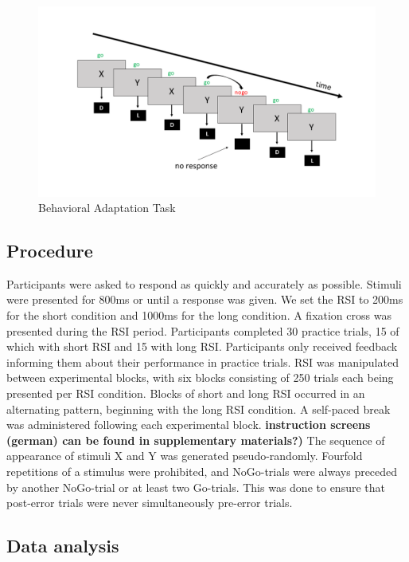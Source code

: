 \documentclass[
  man,floatsintext]{apa7}
\begin{document}
\begin{figure}
\centering
\includegraphics{images/bat_slide_pp/Slide1.png}
\caption{\label{fig:bat-example}Behavioral Adaptation Task}
\end{figure}

\hypertarget{procedure}{%
\subsection{Procedure}\label{procedure}}

Participants were asked to respond as quickly and accurately as possible. Stimuli were presented for 800ms or until a response was given. We set the RSI to 200ms for the short condition and 1000ms for the long condition. A fixation cross was presented during the RSI period. Participants completed 30 practice trials, 15 of which with short RSI and 15 with long RSI. Participants only received feedback informing them about their performance in practice trials. RSI was manipulated between experimental blocks, with six blocks consisting of 250 trials each being presented per RSI condition. Blocks of short and long RSI occurred in an alternating pattern, beginning with the long RSI condition. A self-paced break was administered following each experimental block. \textbf{instruction screens (german) can be found in supplementary materials?)} The sequence of appearance of stimuli X and Y was generated pseudo-randomly. Fourfold repetitions of a stimulus were prohibited, and NoGo-trials were always preceded by another NoGo-trial or at least two Go-trials. This was done to ensure that post-error trials were never simultaneously pre-error trials.

\hypertarget{data-analysis}{%
\subsection{Data analysis}\label{data-analysis}}
\end{document}
